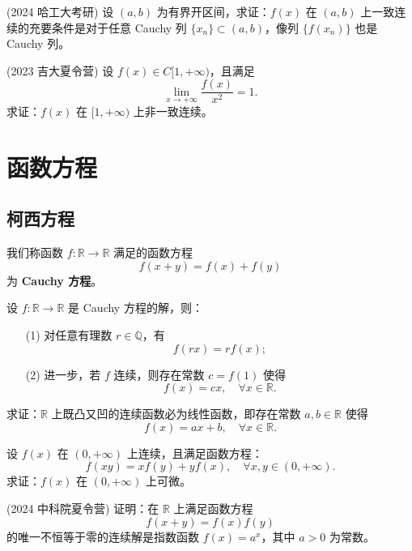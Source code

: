 \documentclass[lang=cn,10pt,thmcnt=section]{elegantbook}
\begin{document}
\begin{example}
	(2024 哈工大考研) 设 \( (a,b) \) 为有界开区间，求证：\( f(x) \) 在 \( (a,b) \) 上一致连续的充要条件是对于任意 Cauchy 列 \( \{x_n\} \subset (a,b) \)，像列 \( \{f(x_n)\} \) 也是 Cauchy 列。
\end{example}
\begin{example}
	(2023 吉大夏令营) 设 \( f(x) \in C[1,+\infty) \)，且满足
    \[ \lim_{x \to +\infty} \frac{f(x)}{x^2} = 1. \]
    求证：\( f(x) \) 在 \( [1,+\infty) \) 上非一致连续。
\end{example}
\section{函数方程}
\subsection{柯西方程}
\begin{definition}
	我们称函数 \( f \colon \mathbb{R} \to \mathbb{R} \) 满足的函数方程
\[ f(x + y) = f(x) + f(y) \]
为 \textbf{Cauchy 方程}。
\end{definition}
\begin{example}
	设 \( f \colon \mathbb{R} \to \mathbb{R} \) 是 Cauchy 方程的解，则：
\begin{enumerate}
    \item[(1)] 对任意有理数 \( r \in \mathbb{Q} \)，有
    \[ f(rx) = r f(x); \]
    \item[(2)] 进一步，若 \( f \) 连续，则存在常数 \( c = f(1) \) 使得
    \[ f(x) = c x, \quad \forall x \in \mathbb{R}. \]
\end{enumerate}
\end{example}
\begin{example}
	求证：\(\mathbb{R}\) 上既凸又凹的连续函数必为线性函数，即存在常数 \( a, b \in \mathbb{R} \) 使得
\[ f(x) = a x + b, \quad \forall x \in \mathbb{R}. \]
\end{example}
\begin{example}
	设 \( f(x) \) 在 \( (0, +\infty) \) 上连续，且满足函数方程：
\[ f(xy) = x f(y) + y f(x), \quad \forall x, y \in (0, +\infty). \]
求证：\( f(x) \) 在 \( (0, +\infty) \) 上可微。
\end{example}
\begin{example}
	(2024 中科院夏令营) 证明：在 \( \mathbb{R} \) 上满足函数方程
\[ f(x+y) = f(x) f(y) \]
的唯一不恒等于零的连续解是指数函数 \( f(x) = a^x \)，其中 \( a > 0 \) 为常数。
\end{example}
\end{document}
